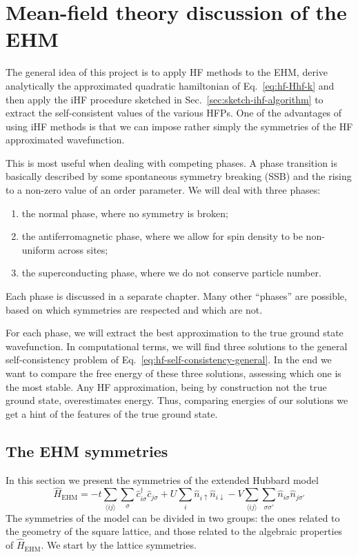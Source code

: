  \def\GraphicsFolder{chapters/mft-discussion/pictures}
\chapter{Mean-field theory discussion of the EHM}\label{chap:mft-discussion}

The general idea of this project is to apply HF methods to the EHM, derive analytically the approximated quadratic hamiltonian of Eq.~\eqref{eq:hf-Hhf-k} and then apply the iHF procedure sketched in Sec.~\ref{sec:sketch-ihf-algorithm} to extract the self-consistent values of the various HFPs. One of the advantages of using iHF methods is that we can impose rather simply the symmetries of the HF approximated wavefunction.

This is most useful when dealing with competing phases. A phase transition is basically described by some spontaneous symmetry breaking (SSB) and the rising to a non-zero value of an order parameter. We will deal with three phases:
\begin{enumerate}
	\item the normal phase, where no symmetry is broken;
	\item the antiferromagnetic phase, where we allow for spin density to be non-uniform across sites;
	\item the superconducting phase, where we do not conserve particle number.
\end{enumerate}
Each phase is discussed in a separate chapter. Many other ``phases'' are possible, based on which symmetries are respected and which are not.

For each phase, we will extract the best approximation to the true ground state wavefunction. In computational terms, we will find three solutions to the general self-consistency problem of Eq.~\eqref{eq:hf-self-consistency-general}. In the end we want to compare the free energy of these three solutions, assessing which one is the most stable. Any HF approximation, being by construction not the true ground state, overestimates energy. Thus, comparing energies of our solutions we get a hint of the features of the true ground state.

\section{The EHM symmetries}

In this section we present the symmetries of the extended Hubbard model
\[
	\hat H_\mathrm{EHM} =
	-t \sum_{\langle ij \rangle} \sum_\sigma \hat c_{i\sigma}^\dagger \hat c_{j\sigma}
	+ U \sum_i \hat n_{i\uparrow} \hat n_{i\downarrow}
	- V \sum_{\langle ij \rangle} \sum_{\sigma \sigma'} \hat n_{i\sigma} \hat n_{j\sigma'}
\]
The symmetries of the model can be divided in two groups: the ones related to the geometry of the square lattice, and those related to the algebraic properties of $\hat H_\mathrm{EHM}$. We start by the lattice symmetries.

